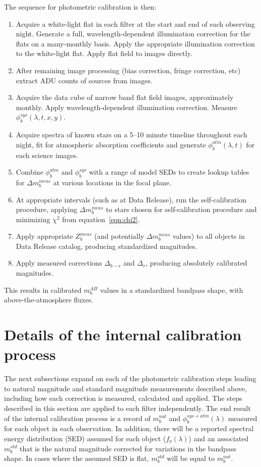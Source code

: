 \documentclass[12pt,preprint]{aastex}
\begin{document}
The sequence for photometric calibration is then:
\begin{enumerate}
\item{Acquire a white-light flat in each filter at the start and end
of each observing night. Generate a full, wavelength-dependent
illumination correction for the flats on a many-monthly basis. Apply
the appropriate illumination correction to the white-light flat. Apply
flat field to images directly.}
\item{After remaining image processing (bias correction, fringe
correction, etc) extract ADU counts of sources from images. }
\item{Acquire the data cube of narrow band flat field images,
approximately monthly. Apply wavelength-dependent illumination
correction. Measure $\phi_b^{sys}(\lambda,t,x,y)$. }
\item{Acquire spectra of known stars on a 5--10 minute timeline
throughout each night, fit for atmospheric absorption coefficients and
generate $\phi_b^{atm}(\lambda,t)$ for each science images. }
\item{Combine $\phi_b^{atm}$ and $\phi_b^{sys}$ with a range of model
SEDs to create lookup tables for $\Delta m_b^{meas}$ at various
locations in the focal plane. }
\item{At appropriate intervals (such as at Data Release), run the
self-calibration procedure, applying $\Delta m_b^{meas}$ to stars
chosen for self-calibration procedure and minimizing $\chi^2$ from
equation~\ref{eqn:chi2}.}
\item{Apply appropriate $Z_b^{meas}$ (and potentially $\Delta
m_b^{meas}$ values) to all objects in Data Release catalog, producing
standardized magnitudes.}
\item{Apply measured corrections $\Delta_{b-r}$ and $\Delta_r$,
producing absolutely calibrated magnitudes.}
\end{enumerate}
This results in calibrated $m_b^{AB}$ values in a standardized
bandpass shape, with above-the-atmosphere fluxes.

\section{Details of the internal calibration process}
\label{sec:calib_details}

The next subsections expand on each of the photometric calibration
steps leading to natural magnitude and standard magnitude measurements
described above, including how each correction is measured, calculated
and applied.  The steps described in this section are applied to each
filter independently. The end result of the internal calibration
process is a record of $m_b^{nat}$ and $\phi_b^{sys+atm}(\lambda)$
measured for each object in each observation. In addition, there will
be a reported spectral energy distribution (SED) assumed for each
object ($f_\nu(\lambda)$) and an associated $m_b^{std}$ that is the
natural magnitude corrected for variations in the bandpass shape. In
cases where the assumed SED is flat, $m_b^{std}$ will be equal to
$m_b^{nat}$.
 
\end{document}
